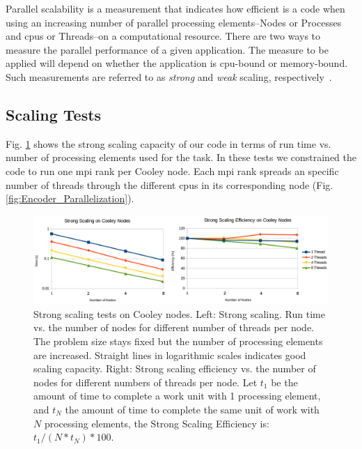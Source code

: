 \documentclass[11pt,a4paper]{article}
\begin{document}
Parallel scalability is a measurement that indicates how efficient is a code when using an increasing number of parallel processing elements--Nodes or Processes and \glspl{cpu} or Threads--on a computational resource. There are two ways to measure the parallel performance of a given application. The measure to be applied will depend on whether the application is \gls{cpu}-bound or memory-bound. Such measurements are referred to as \emph{strong} and \emph{weak} scaling, respectively~\cite{noauthor_measuring_nodate}.












\subsection{ Scaling Tests}

Fig. \ref{fig:Strong_Scaling} shows the strong scaling capacity of our code in terms of run time vs. number of processing elements used for the task. In these tests we constrained the code to run one \gls{mpi} rank per Cooley node. Each \gls{mpi} rank spreads an specific number of threads through the different \glspl{cpu} in its corresponding node (Fig. \ref{fig:Encoder_Parallelization}).

\begin{figure}[h!]
    \centering
    \includegraphics[width=1.0\textwidth]{Strong_Scaling.png}
    \caption{Strong scaling tests on Cooley nodes. Left: Strong scaling. Run time vs. the number of nodes for different number of threads per node. The problem size stays fixed but the number of processing elements are increased. Straight lines in logarithmic scales indicates good scaling capacity. Right: Strong scaling efficiency vs. the number of nodes for different numbers of threads per node. Let $t_1$ be the amount of time to complete a work unit with 1 processing element, and $t_N$ the amount of time to complete the same unit of work with $N$ processing elements, the Strong Scaling Efficiency is: $t_1 / (N * t_N) * 100$.}
    \label{fig:Strong_Scaling}
\end{figure}
\end{document}
